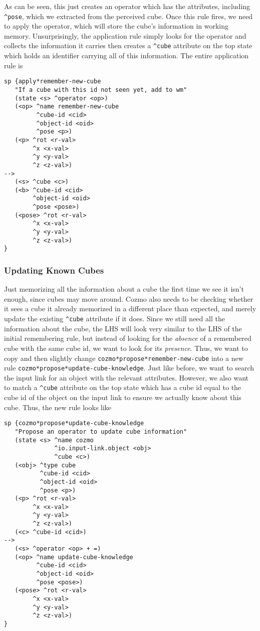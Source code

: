 As can be seen, this just creates an operator which has the attributes,
including \texttt{\^{}pose}, which we extracted from the perceived cube.
Once this rule fires, we need to apply the operator, which will store
the cube's information in working memory. Unsurprisingly, the
application rule simply looks for the operator and collects the
information it carries then creates a \texttt{\^{}cube} attribute on the
top state which holds an identifier carrying all of this information.
The entire application rule is

\begin{verbatim}
sp {apply*remember-new-cube
   "If a cube with this id not seen yet, add to wm"
   (state <s> ^operator <op>)
   (<op> ^name remember-new-cube
         ^cube-id <cid>
         ^object-id <oid>
         ^pose <p>)
   (<p> ^rot <r-val>
        ^x <x-val>
        ^y <y-val>
        ^z <z-val>)
-->
   (<s> ^cube <c>)
   (<b> ^cube-id <cid>
        ^object-id <oid>
        ^pose <pose>)
   (<pose> ^rot <r-val>
        ^x <x-val>
        ^y <y-val>
        ^z <z-val>)
}
\end{verbatim}

\hypertarget{updating-known-cubes}{%
\subsubsection{Updating Known Cubes}\label{updating-known-cubes}}

Just memorizing all the information about a cube the first time we see
it isn't enough, since cubes may move around. Cozmo also needs to be
checking whether it sees a cube it already memorized in a different
place than expected, and merely update the existing \texttt{\^{}cube}
attribute if it does. Since we still need all the information about the
cube, the LHS will look very similar to the LHS of the initial
remembering rule, but instead of looking for the \emph{absence} of a
remembered cube with the same cube id, we want to look for its
\emph{presence}. Thus, we want to copy and then slightly change
\texttt{cozmo*propose*remember-new-cube} into a new rule
\texttt{cozmo*propose*update-cube-knowledge}. Just like before, we want
to search the input link for an object with the relevant attributes.
However, we also want to match a \texttt{\^{}cube} attribute on the top
state which has a cube id equal to the cube id of the object on the
input link to ensure we actually know about this cube. Thus, the new
rule looks like

\begin{verbatim}
sp {cozmo*propose*update-cube-knowledge
   "Propose an operator to update cube information"
   (state <s> ^name cozmo
              ^io.input-link.object <obj>
              ^cube <c>)
   (<obj> ^type cube
          ^cube-id <cid>
          ^object-id <oid>
          ^pose <p>)
   (<p> ^rot <r-val>
        ^x <x-val>
        ^y <y-val>
        ^z <z-val>)
   (<c> ^cube-id <cid>)
-->
   (<s> ^operator <op> + =)
   (<op> ^name update-cube-knowledge
         ^cube-id <cid>
         ^object-id <oid>
         ^pose <pose>)
   (<pose> ^rot <r-val>
        ^x <x-val>
        ^y <y-val>
        ^z <z-val>)
}
\end{verbatim}

